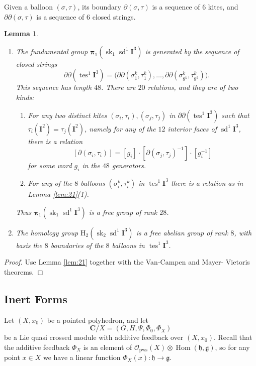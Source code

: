 \documentclass[10pt, a4paper]{amsart}
\newtheorem{lem}[equation]{Lemma}
\theoremstyle{definition}
\numberwithin{equation}{section}
\newcommand{\opn}{\operatorname}
\newcommand{\mfrak}[1]{\mathfrak{#1}}
\newcommand{\mcal}[1]{\mathcal{#1}}
\newcommand{\mbf}[1]{\mathbf{#1}}
\newcommand{\mrm}[1]{\mathrm{#1}}
\newcommand{\tup}[1]{\textup{#1}}
\newcommand{\bsym}[1]{\boldsymbol{#1}}
\newcommand{\g}{\mfrak{g}}
\newcommand{\h}{\mfrak{h}}
\newcommand{\lb}{\linebreak}
\begin{document}
Given a balloon $(\sigma, \tau)$, its boundary 
$\partial(\sigma, \tau)$ is a sequence of $6$ kites, and
$\partial \partial(\sigma, \tau)$ is a sequence of $6$ closed strings.

\begin{lem} \label{lem:22} \mbox{}
\begin{enumerate}
\item The fundamental group 
$\bsym{\pi}_1(\opn{sk}_1 \opn{sd}^1 \mbf{I}^3)$ is generated by
the \linebreak sequence of closed strings 
\[ \partial \partial (\opn{tes}^1 \mbf{I}^3)
= \bigl( \partial \partial (\sigma^{k}_1, \tau^{k}_1) , \ldots, 
\partial \partial (\sigma^{k}_{8^k}, \tau^{k}_{8^k}) \bigr) .
\]
This sequence has length $48$. 
There are $20$ relations, and they are of two kinds:
\begin{enumerate}
\item For any two distinct kites 
$(\sigma_{i}, \tau_{i}), (\sigma_{j}, \tau_{j})$
in $\partial \partial (\opn{tes}^1 \mbf{I}^3)$
such that $\tau_i(\mbf{I}^2) = \tau_j(\mbf{I}^2)$, namely for any of
the $12$ interior faces of $\opn{sd}^1 \mbf{I}^3$, there is a relation
\[ [\partial (\sigma_{i}, \tau_{i})] = [g_i] \cdot
[\partial (\sigma_{j}, \tau_{j})^{-1}] \cdot [g_i^{-1}] \]
for some word $g_i$ in the $48$ generators.
%
\item For any of the $8$ balloons 
$(\sigma^{k}_i, \tau^{k}_i)$
in $\opn{tes}^1 \mbf{I}^3$ there is a
relation as in Lemma \tup{\ref{lem:21}(1)}.
\end{enumerate}
Thus $\bsym{\pi}_1(\opn{sk}_1 \opn{sd}^1 \mbf{I}^3)$ is a free group
of rank $28$.  
%
\item The homology group $\mrm{H}_2(\opn{sk}_2 \opn{sd}^1 \mbf{I}^3)$
is a free abelian group of rank $8$, with basis the $8$ boundaries of
the $8$ balloons in $\opn{tes}^1 \mbf{I}^3$.
\end{enumerate}
\end{lem}

\begin{proof}
Use Lemma \ref{lem:21} together with the Van-Campen and Mayer- \lb Vietoris
theorems.
\end{proof}


\subsection{Inert Forms} \label{subsec:inert}
Let $(X, x_0)$ be a pointed polyhedron, and let
\[ \mbf{C} / X = (G, H, \Psi, \Phi_0, \Phi_X) \]
be a Lie quasi crossed module with additive feedback over $(X, x_0)$.
Recall that the additive feedback
$\Phi_X$ is an element of 
$\mcal{O}_{\mrm{pws}}(X) \otimes \opn{Hom}(\h, \g)$, so for any point
$x \in X$ we have a linear function
$\Phi_X(x) : \h \to \g$. 
\end{document}
